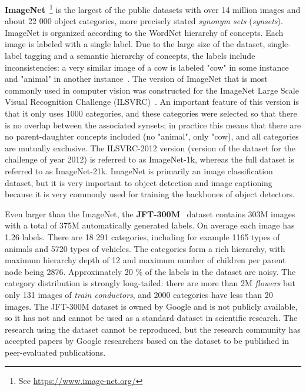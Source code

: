 \documentclass[english,twoside,openright]{HYgraduMLDS}
\begin{document}
\textbf{ImageNet}~\cite{imagenet_cvpr09, Imagenet}\footnote{See \url{https://www.image-net.org/}} is the largest of the public datasets with over 14 million images and about 22 000 object categories, more precisely stated \textit{synonym sets} (\textit{synsets}). ImageNet is organized according to the WordNet hierarchy of concepts. Each image is labeled with a single label. Due to the large size of the dataset, single-label tagging and a semantic hierarchy of concepts, the labels include inconsistencies: a very similar image of a cow is labeled "cow" in some instance and "animal" in another instance~\cite{ImageNet21k_Pretraining}. The version of ImageNet that is most commonly used in computer vision was constructed for the ImageNet Large Scale Visual Recognition Challenge (ILSVRC)~\cite{Imagenet}. An important feature of this version is that it only uses 1000 categories, and these categories were selected so that there is no overlap between the associated synsets; in practice this means that there are no parent-daughter concepts included (no "animal", only "cow), and all categories are mutually exclusive. The ILSVRC-2012 version (version of the dataset for the challenge of year 2012) is referred to as ImageNet-1k, whereas the full dataset is referred to as ImageNet-21k. ImageNet is primarily an image classification dataset, but it is very important to object detection and image captioning because it is very commonly used for training the backbones of object detectors. 

Even larger than the ImageNet, the \textbf{JFT-300M}~\cite{JFT} dataset contains 303M images with a total of 375M automatically generated labels. On average each image has 1.26 labels. There are 18 291 categories, including for example 1165 types of animals and 5720 types of vehicles. The categories form a rich hierarchy, with maximum hierarchy depth of 12 and maximum number of children per parent node being 2876. Approximately 20 \% of the labels in the dataset are noisy. The category distribution is strongly long-tailed: there are more than 2M \textit{flowers} but only 131 images of \textit{train conductors}, and 2000 categories have less than 20 images. The JFT-300M dataset is owned by Google and is not publicly available, so it has not and cannot be used as a standard dataset in scientific research. The research using the dataset cannot be reproduced, but the research community has accepted papers by Google researchers based on the dataset to be published in peer-evaluated publications.
\end{document}
